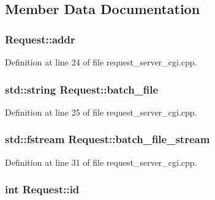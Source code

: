\subsection{Member Data Documentation}
\subsubsection[{\texorpdfstring{addr}{addr}}]{ Request\+::addr}\hypertarget{classRequest_a1d6fd040a0dd5c3d0da514cf234d33cd}{}\label{classRequest_a1d6fd040a0dd5c3d0da514cf234d33cd}


Definition at line 24 of file request\+\_\+server\+\_\+cgi.\+cpp.

\subsubsection[{\texorpdfstring{batch\+\_\+file}{batch_file}}]{\setlength{\rightskip}{0pt plus 5cm}std\+::string Request\+::batch\+\_\+file}\hypertarget{classRequest_aa5246e928a295ef769e474312d558b85}{}\label{classRequest_aa5246e928a295ef769e474312d558b85}


Definition at line 25 of file request\+\_\+server\+\_\+cgi.\+cpp.

\subsubsection[{\texorpdfstring{batch\+\_\+file\+\_\+stream}{batch_file_stream}}]{\setlength{\rightskip}{0pt plus 5cm}std\+::fstream Request\+::batch\+\_\+file\+\_\+stream}\hypertarget{classRequest_a7ebbfa97cb7b1c6605e9d799f3287354}{}\label{classRequest_a7ebbfa97cb7b1c6605e9d799f3287354}


Definition at line 31 of file request\+\_\+server\+\_\+cgi.\+cpp.

\subsubsection[{\texorpdfstring{id}{id}}]{\setlength{\rightskip}{0pt plus 5cm}int Request\+::id}\hypertarget{classRequest_a026538b5d27774177b27d0552d25fa13}{}\label{classRequest_a026538b5d27774177b27d0552d25fa13}


